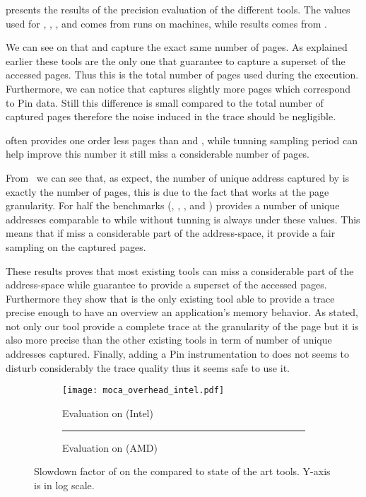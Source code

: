  presents the results of the precision evaluation of the
different tools. The values used for \Mitos, \MitosTun, \Moca, \MocaPin and
\TABARNAC comes from runs on \Edel machines, while \MemProf results comes from
\Idfreeze.

We can see on  that \Moca and \TABARNAC capture the exact same
number of pages. As explained earlier these tools are the only one that
guarantee to capture a superset of the accessed pages. Thus this is the total
number of pages used during the execution. Furthermore, we can notice that
\MocaPin captures slightly more pages which correspond to Pin data. Still
this difference is small compared to the total number of captured pages
therefore the noise induced in the trace should be negligible.

\Mitos often provides one order less pages than \Moca and \TABARNAC, while
tunning \Mitos sampling period can help improve this number it still miss a
considerable number of pages.

From  we can see that, as expect, the number of unique address captured by
\TABARNAC is exactly the number of pages, this is due to the fact that
\TABARNAC works at the page granularity. For half the benchmarks (\BT,
\EP, \LU, \SP and \UA) \MitosTun provides a number of unique addresses
comparable to \Moca while \Mitos without tunning is always under these values.
This means that if \Mitos miss a considerable part of the address-space, it
provide a fair sampling on the captured pages.


These results proves that most existing tools can miss a considerable part of
the address-space while \Moca guarantee to provide a superset of the accessed
pages. Furthermore they show that \Moca is the only existing tool able to provide a
trace precise enough to have an overview an application's memory behavior. As
stated, not only our tool provide a complete trace at the granularity of the
page but it is also more precise than the other existing tools in term of
number of unique addresses captured. Finally, adding a Pin instrumentation to
\Moca does not seems to disturb considerably the trace quality thus it seems
safe to use it.

\begin{figure}[htb]
    \centering
    \begin{subfigure}{\linewidth}
        \texttt{[image: moca\_overhead\_intel.pdf]}
        \caption{Evaluation on \Edel (Intel)}
        \label{fig:ovh-Intel}
    \end{subfigure}
    \begin{subfigure}{\linewidth}
        \rule{8cm}{6cm}
        \caption{Evaluation on \Idfreeze (AMD)}
        \label{fig:ovh-AMD}
    \end{subfigure}
    \caption{Slowdown factor of \Moca on the \NPB compared to state of the art tools.
    Y-axis is in log scale.}
    \label{fig:ovh}
\end{figure}

